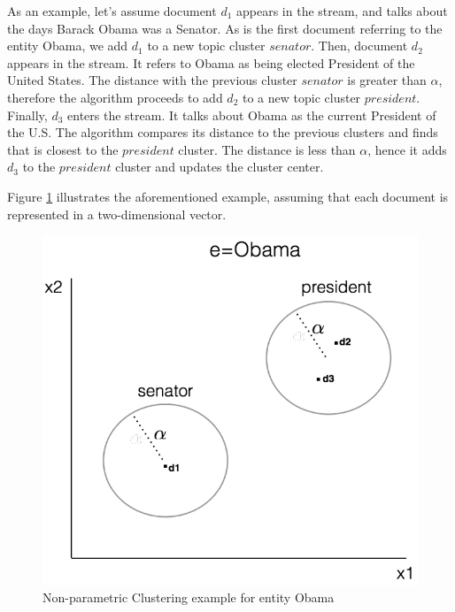 \documentclass{article}
\begin{document}

As an example, let's assume document $d_1$ appears in the stream, and talks about the days Barack Obama was a Senator. As is the first document referring to the entity Obama, we add $d_1$ to a new topic cluster $senator$. Then, document $d_2$ appears in the stream. It refers to Obama as being elected President of the United States. The distance with the previous cluster $senator$ is greater than $\alpha$, therefore the algorithm proceeds to add $d_2$ to a new topic cluster $president$. Finally, $d_3$ enters the stream. It talks about Obama as the current President of the U.S. The algorithm compares its distance to the previous clusters and finds that is closest to the $president$ cluster. The distance is less than $\alpha$, hence it adds $d_3$ to the $president$ cluster and updates the cluster center. 

Figure \ref{obama} illustrates the aforementioned example, assuming that each document is represented in a two-dimensional vector.

\begin{figure}[tb]
\centering
\includegraphics[width=0.7\columnwidth]{fig/obamaExample.pdf}
\caption{Non-parametric Clustering example for entity Obama}
\label{obama}
\end{figure}
\end{document}
